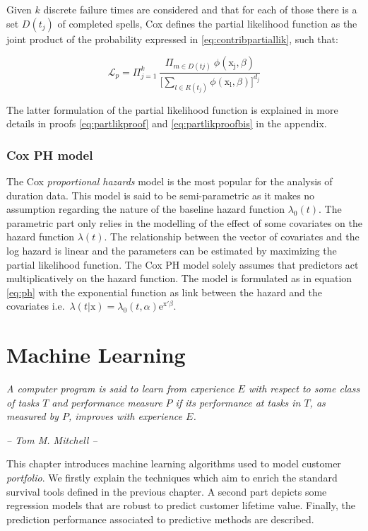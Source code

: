 \documentclass[
]{book}
\begin{document}
Given \(k\) discrete failure times are considered and that for each of those there is a set \(D(t_j)\) of completed spells, Cox defines the partial likelihood function as the joint product of the probability expressed in \eqref{eq:contribpartiallik}, such that:

\begin{equation}
  \mathcal{L}_p = \Pi_{j=1}^{k} \ \frac{\Pi_{m \in D(tj)} \ \phi(\mathrm{x_j}, \beta)}{\Big[\sum_{l \in R(t_j)} \phi(\mathrm{x_l}, \beta)\Big]^{d_j}}
  \label{eq:partlik}
\end{equation}

The latter formulation of the partial likelihood function is explained in more details in proofs \eqref{eq:partlikproof} and \eqref{eq:partlikproofbis} in the appendix.

\hypertarget{cox-ph-model}{%
\subsection{Cox PH model}\label{cox-ph-model}}

The Cox \emph{proportional hazards} model is the most popular for the analysis of duration data. This model is said to be semi-parametric as it makes no assumption regarding the nature of the baseline hazard function \(\lambda_0(t)\). The parametric part only relies in the modelling of the effect of some covariates on the hazard function \(\lambda(t)\). The relationship between the vector of covariates and the log hazard is linear and the parameters can be estimated by maximizing the partial likelihood function. The Cox PH model solely assumes that predictors act multiplicatively on the hazard function. The model is formulated as in equation \eqref{eq:ph} with the exponential function as link between the hazard and the covariates i.e.~\(\lambda(t|\pmb{\mathrm{x}}) = \lambda_0 (t,\alpha) \text{e}^{\pmb{\mathrm{x'}} \beta}\).

\hypertarget{ml}{%
\chapter{Machine Learning}\label{ml}}

\emph{A computer program is said to learn from experience \(E\) with respect to some class of tasks \(T\) and performance measure \(P\) if its performance at tasks in \(T\), as measured by \(P\), improves with experience \(E\).}

\emph{-- Tom M. Mitchell --}

This chapter introduces machine learning algorithms used to model customer \emph{portfolio}. We firstly explain the techniques which aim to enrich the standard survival tools defined in the previous chapter. A second part depicts some regression models that are robust to predict customer lifetime value. Finally, the prediction performance associated to predictive methods are described.
\end{document}
